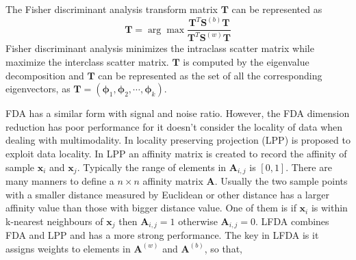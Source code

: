\documentclass[conference,compsoc]{IEEEtran}
\begin{document}
The Fisher discriminant analysis transform matrix $\bm{T}$ can be represented as 
\begin{equation}
\bm{T} = \arg\max \frac{\bm{T}^T\bm{S}^{(b)}\bm{T}}{\bm{T}^T\bm{S}^{(w)}\bm{T}}
\end{equation}
Fisher discriminant analysis minimizes the intraclass scatter matrix while maximize the interclass scatter matrix. $\bm{T}$ is computed by the eigenvalue decomposition and $\bm{T}$ can be represented as the set of all the corresponding eigenvectors, as $ \bm{T} = (\bm{\phi}_1,\bm{\phi}_2,\cdots,\bm{\phi}_k)$.

FDA has a similar form with signal and noise ratio. However, the FDA dimension reduction has poor performance for it doesn't consider the locality of data when dealing with multimodality. In \cite{LPP} locality preserving projection (LPP) is proposed to exploit data locality. In LPP an affinity matrix is created to record the affinity of sample $\bm{x}_i$ and $\bm{x}_j$.  Typically the range of elements in $\bm{A}_{i,j}$ is $[0,1]$. There are many manners to define a $n \times n$ affinity matrix $\bm{A}$. Usually the two sample points with a smaller distance measured by Euclidean or other distance has a larger affinity value than those with bigger distance value. One of them is if  $\bm{x}_i$ is within k-nearest neighbours of $\bm{x}_j$ then $\bm{A}_{i,j} = 1$ otherwise  $\bm{A}_{i,j} = 0$.  LFDA combines FDA and LPP and has a more strong performance. The key in LFDA is it assigns weights to elements in $\bm{A}^{(w)}$ and $\bm{A}^{(b)}$, so that,

%
%
\end{document}
